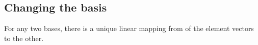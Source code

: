 
\subsection{Changing the basis}

For any two bases, there is a unique linear mapping from of the element vectors to the other.

